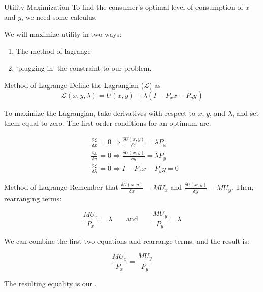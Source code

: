 \documentclass[11pt,t]{beamer}
\begin{document}
\begin{frame}{Utility Maximization}
  To find the consumer's optimal level of consumption of $x$  and $y$, we need some calculus.

  \bigskip
  We will maximize utility in two-ways:
  \begin{enumerate}
    \item The method of lagrange

    \item `plugging-in' the constraint to our problem.
  \end{enumerate} 
\end{frame}

\begin{frame}{Method of Lagrange}
  Define the Lagrangian ($\mathcal{L}$) as 
  $$
    \mathcal{L}(x,y,\lambda) = U(x,y) + \lambda(I-P_x x - P_y y)
  $$


  \pause
  To maximize the Lagrangian, take derivatives with respect to $x$, $y$, and $\lambda$, and set them equal to zero. The first order conditions for an optimum are:

  \vspace*{-10mm}
  \begin{align*}
    &\frac{\delta \mathcal{L}}{\delta x}=0 \Rightarrow \frac{\delta U(x,y)}{\delta x} = \lambda P_x \\
    &\frac{\delta \mathcal{L}}{\delta y}=0 \Rightarrow \frac{\delta U(x,y)}{\delta y} = \lambda P_y \\
    &\frac{\delta \mathcal{L}}{\delta \lambda}=0 \Rightarrow I - P_x x - P_y y = 0
  \end{align*}
\end{frame}
  
\begin{frame}{Method of Lagrange}
  Remember that $\frac{\delta U(x,y)}{\delta x} = MU_x$ and $\frac{\delta U(x,y)}{\delta y} = MU_y$. Then, rearranging terms:

  $$
  \frac{MU_x}{P_x} = \lambda \qquad \text{and} \qquad \frac{MU_y}{P_y} = \lambda
  $$

  \pause\bigskip 
  We can combine the first two equations and rearrange terms, and the result is:

  $$
  \frac{MU_x}{P_x} = \frac{MU_y}{P_y}
  $$
  
  \pause\bigskip
  The resulting equality is our .
\end{frame}
\end{document}
